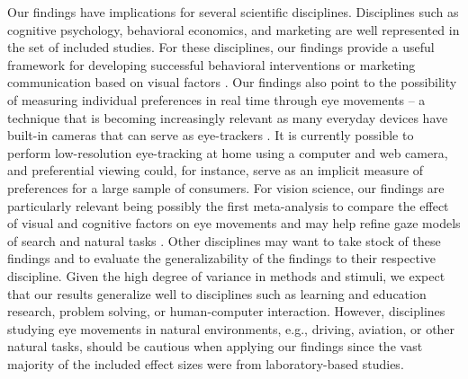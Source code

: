 Our findings have implications for several scientific disciplines. Disciplines such as cognitive psychology, behavioral economics, and marketing are well represented in the set of included studies. For these disciplines, our findings provide a useful framework for developing successful behavioral interventions or marketing communication based on visual factors \citep{muenscher2016a, orquinwedel2020}. Our findings also point to the possibility of measuring individual preferences in real time through eye movements -- a technique that is becoming increasingly relevant as many everyday devices have built-in cameras that can serve as eye-trackers \citep{bulling2019a}. It is currently possible to perform low-resolution eye-tracking at home using a computer and web camera, and preferential viewing could, for instance, serve as an implicit measure of preferences for a large sample of consumers. For vision science, our findings are particularly relevant being possibly the first meta-analysis to compare the effect of visual and cognitive factors on eye movements and may help refine gaze models of search \citep{vanderlans2008} and natural tasks \citep{hayhoe2005}. Other disciplines may want to take stock of these findings and to evaluate the generalizability of the findings to their respective discipline. Given the high degree of variance in methods and stimuli, we expect that our results generalize well to disciplines such as learning and education research, problem solving, or human-computer interaction. However, disciplines studying eye movements in natural environments, e.g., driving, aviation, or other natural tasks, should be cautious when applying our findings since the vast majority of the included effect sizes were from laboratory-based studies.

